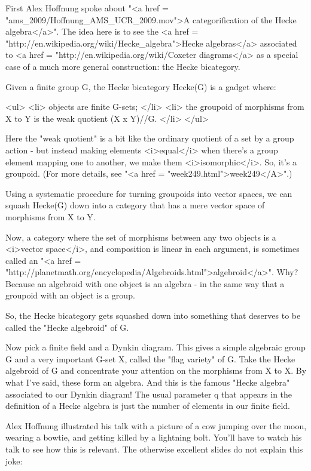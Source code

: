 First Alex Hoffnung spoke about "<a href =
"ams_2009/Hoffnung_AMS_UCR_2009.mov">A categorification of the Hecke
algebra</a>".  The idea here is to see the <a href =
"http://en.wikipedia.org/wiki/Hecke_algebra">Hecke algebras</a>
associated to <a href =
"http://en.wikipedia.org/wiki/Coxeter%
diagrams</a> as a special case of a much more general construction:
the Hecke bicategory.

Given a finite group G, the Hecke bicategory Hecke(G) is a gadget
where:

<ul>
<li>
 objects are finite G-sets;
</li>
<li>
 the groupoid of morphisms from X to Y is the weak quotient (X x Y)//G.
</li>
</ul>

Here the "weak quotient" is a bit like the ordinary quotient
of a set by a group action - but instead making elements <i>equal</i>
when there's a group element mapping one to another, we make them
<i>isomorphic</i>.  So, it's a groupoid.  (For more details, see
"<a href = "week249.html">week249</A>".)

Using a systematic procedure for turning groupoids into vector spaces,
we can squash Hecke(G) down into a category that has a mere vector
space of morphisms from X to Y.  

Now, a category where the set of morphisms between any two objects is
a <i>vector space</i>, and composition is linear in each argument, is
sometimes called an "<a href =
"http://planetmath.org/encyclopedia/Algebroids.html">algebroid</a>".
Why?  Because an algebroid with one object is an algebra - in the same
way that a groupoid with an object is a group.

So, the Hecke bicategory gets squashed down into something that
deserves to be called the "Hecke algebroid" of G.

Now pick a finite field and a Dynkin diagram.  This gives a simple
algebraic group G and a very important G-set X, called the "flag
variety" of G.  Take the Hecke algebroid of G and concentrate
your attention on the morphisms from X to X.  By what I've said, these
form an algebra.  And this is the famous "Hecke algebra"
associated to our Dynkin diagram!  The usual parameter q that appears
in the definition of a Hecke algebra is just the number of elements in
our finite field.

Alex Hoffnung illustrated his talk with a picture of a cow jumping over
the moon, wearing a bowtie, and getting killed by a lightning bolt. 
You'll have to watch his talk to see how this is relevant.  The
otherwise excellent slides do not explain this joke:

